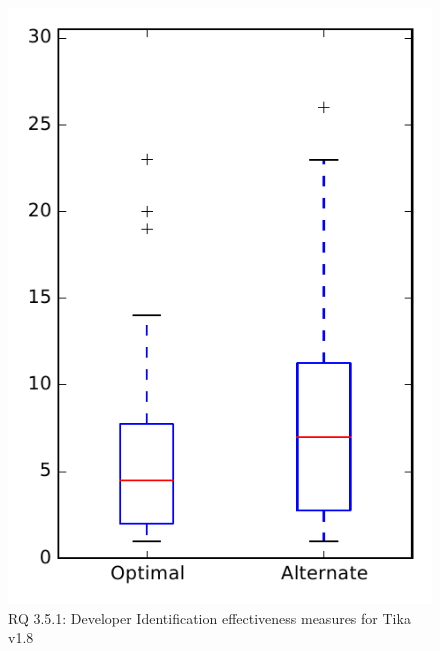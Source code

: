 
\begin{figure}
\centering
\includegraphics[height=0.4\textheight]{figures/combo/dit_rq1_tika}
\caption{RQ 3.5.1: Developer Identification effectiveness measures for Tika v1.8}
\label{fig:dit:rq1:tika}
\end{figure}
